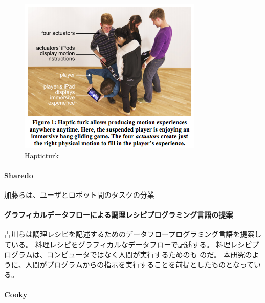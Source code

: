 \begin{figure}[htbp]
  \begin{center}
  \includegraphics[width=.6\linewidth,bb=0 0 332 281]{images/hapticturk.png}
  \end{center}
  \caption{Hapticturk}
  \label{fig:hapticturk}
\end{figure}

\paragraph{Sharedo}\label{sharedo}

\mbox{}

加藤らは、ユーザとロボット間のタスクの分業

\cite{sharedo}

\paragraph{グラフィカルデータフローによる調理レシピプログラミング言語の提案}\label{ux30b0ux30e9ux30d5ux30a3ux30abux30ebux30c7ux30fcux30bfux30d5ux30edux30fcux306bux3088ux308bux8abfux7406ux30ecux30b7ux30d4ux30d7ux30edux30b0ux30e9ux30dfux30f3ux30b0ux8a00ux8a9eux306eux63d0ux6848}

\mbox{}

吉川らは調理レシピを記述するためのデータフロープログラミング言語を提案している\cite{recipe-programming}。
料理レシピをグラフィカルなデータフローで記述する。
料理レシピプログラムは、コンピュータではなく人間が実行するためのも
のだ。
本研究のように、人間がプログラムからの指示を実行することを前提としたものとなっている。

\paragraph{Cooky}\label{cooky}

\mbox{}

